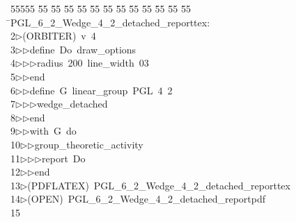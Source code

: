 %
%
\begin{tabbing}
55555 \= 55 \= 55 \= 55 \= 55 \= 55 \= 55 \= 55 \= 55 \= 55 \= 55 \= 55 \= 55 \= \>PGL\_6\_2\_Wedge\_4\_2\_detached\_reporttex:\\[0pt]
2\>$\triangleright$\>(ORBITER)\ v\ 4\ \\[0pt]
3\>$\triangleright$\>$\triangleright$\>define\ Do\ draw\_options\ \\[0pt]
4\>$\triangleright$\>$\triangleright$\>$\triangleright$\>radius\ 200\ line\_width\ 03\ \\[0pt]
5\>$\triangleright$\>$\triangleright$\>end\ \\[0pt]
6\>$\triangleright$\>$\triangleright$\>define\ G\ linear\_group\ PGL\ 4\ 2\ \\[0pt]
7\>$\triangleright$\>$\triangleright$\>$\triangleright$\>wedge\_detached\ \\[0pt]
8\>$\triangleright$\>$\triangleright$\>end\ \\[0pt]
9\>$\triangleright$\>$\triangleright$\>with\ G\ do\ \\[0pt]
10\>$\triangleright$\>$\triangleright$\>group\_theoretic\_activity\ \\[0pt]
11\>$\triangleright$\>$\triangleright$\>$\triangleright$\>report\ Do\ \\[0pt]
12\>$\triangleright$\>$\triangleright$\>end\\[0pt]
13\>$\triangleright$\>(PDFLATEX)\ PGL\_6\_2\_Wedge\_4\_2\_detached\_reporttex\\[0pt]
14\>$\triangleright$\>(OPEN)\ PGL\_6\_2\_Wedge\_4\_2\_detached\_reportpdf\\[0pt]
15\>\end{tabbing}
